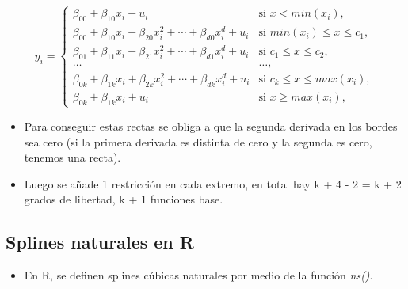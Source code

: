 \documentclass[
]{article}
\newenvironment{Shaded}{\begin{snugshade}}{\end{snugshade}}
\newcommand{\DataTypeTok}[1]{\textcolor[rgb]{0.13,0.29,0.53}{#1}}
\newcommand{\DecValTok}[1]{\textcolor[rgb]{0.00,0.00,0.81}{#1}}
\newcommand{\KeywordTok}[1]{\textcolor[rgb]{0.13,0.29,0.53}{\textbf{#1}}}
\newcommand{\NormalTok}[1]{#1}
\newcommand{\OperatorTok}[1]{\textcolor[rgb]{0.81,0.36,0.00}{\textbf{#1}}}
\providecommand{\tightlist}{%
  \setlength{\itemsep}{0pt}\setlength{\parskip}{0pt}}
\begin{document}
\[
\begin{equation*}
y_i =
\begin{cases}
\beta_{00} + \beta_{10} x_i + u_i & \text{si } x < min(x_i),\\
\beta_{00} + \beta_{10} x_i + \beta_{20} x_i^2 + \cdots + \beta_{d0} x_i^d + u_i & \text{si } min(x_i) \leq x \leq c_1, \\
\beta_{01} + \beta_{11} x_i + \beta_{21} x_i^2 + \cdots + \beta_{d1} x_i^d + u_i & \text{si } c_1 \leq x \leq c_2, \\
\ldots & \ldots, \\
\beta_{0k} + \beta_{1k} x_i + \beta_{2k} x_i^2 + \cdots + \beta_{dk} x_i^d + u_i & \text{si } c_k \leq x \leq max(x_i), \\
\beta_{0k} + \beta_{1k} x_i + u_i & \text{si } x \geq max(x_i),
\end{cases}
\end{equation*}
\]

\begin{itemize}
\item
  Para conseguir estas rectas se obliga a que la segunda derivada en los
  bordes sea cero (si la primera derivada es distinta de cero y la
  segunda es cero, tenemos una recta).
\item
  Luego se añade 1 restricción en cada extremo, en total hay k + 4 - 2 =
  k + 2 grados de libertad, k + 1 funciones base.
\end{itemize}

\hypertarget{splines-naturales-en-r}{%
\subsection{Splines naturales en R}\label{splines-naturales-en-r}}

\begin{itemize}
\tightlist
\item
  En R, se definen splines cúbicas naturales por medio de la función
  \emph{ns()}.
\end{itemize}

\begin{Shaded}
\end{Shaded}
\end{document}

